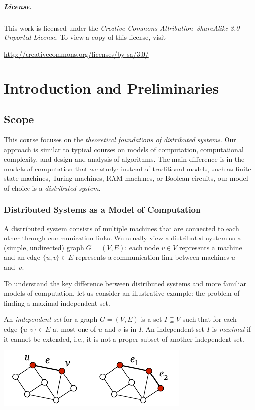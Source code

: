 \paragraph{License.}

This work is licensed under the \emph{Creative Commons Attribution--ShareAlike 3.0 Unported License}. To view a copy of this license, visit
\begin{center}
    \url{http://creativecommons.org/licenses/by-sa/3.0/}
\end{center}

\mainmatter
\chapter{Introduction and Preliminaries}

\section{Scope}

This course focuses on the \emph{theoretical foundations of distributed systems}. Our approach is similar to typical courses on models of computation, computational complexity, and design and analysis of algorithms. The main difference is in the models of computation that we study: instead of traditional models, such as finite state machines, Turing machines, RAM machines, or Boolean circuits, our model of choice is a \emph{distributed system}.

\subsection{Distributed Systems as a Model of Computation}\label{ssec:prelim-model}

A distributed system consists of multiple machines that are connected to each other through communication links. We usually view a distributed system as a (simple, undirected) graph $G = (V,E)$: each node $v \in V$ represents a machine and an edge $\{u,v\} \in E$ represents a communication link between machines $u$ and~$v$.

To understand the key difference between distributed systems and more familiar models of computation, let us consider an illustrative example: the problem of finding a maximal independent set.

An \emph{independent set} for a graph $G = (V,E)$ is a set $I \subseteq V$ such that for each edge $\{u,v\} \in E$ at most one of $u$ and $v$ is in $I$. An independent set $I$ is \emph{maximal} if it cannot be extended, i.e., it is not a proper subset of another independent set.
\begin{center}
    \includegraphics[page=\PIndependentSet]{figs.pdf}
\end{center}

